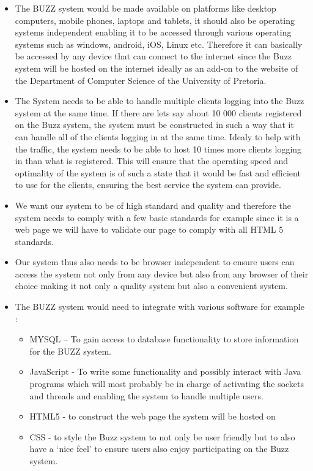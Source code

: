 \documentclass[a4paper]{article}
\begin{document}
\begin{itemize}
\item The BUZZ system would be made available on platforms like desktop computers, mobile phones, laptops and tablets, it should also be operating systems independent enabling it to be accessed through various operating systems such as  windows, android, iOS, Linux etc. Therefore it can basically be accessed by any device that can connect to the internet since the Buzz system will be hosted on the internet ideally as an add-on to the website of the Department of Computer Science of the University of Pretoria. 
\item The System needs to be able to handle multiple clients logging into the Buzz system at the same time. If there are lets say about 10 000 clients registered on the Buzz system, the system must be constructed in such a way that it can handle all of the clients logging in at the same time. Idealy to help with the traffic, the system needs to be able to host 10 times more clients logging in than what is registered. This will ensure that the operating speed and optimality of the system is of such a state that it would be fast and efficient to use for the clients, ensuring the best service the system can provide.
\item We want our system to be of high standard and quality and therefore the system needs to comply with a few basic standards for example  since it is a web page we will have to validate our page to comply with all HTML 5 standards. 
\item Our system thus also needs to be browser independent to ensure users can access the system not only from any device but also from any browser of their choice making it not only a quality system but also a convenient system.
\item The BUZZ system would need to integrate with various software for example :
\begin{itemize}
\item  MYSQL – To gain access to database functionality to store information for the BUZZ system.
\item JavaScript - To write some functionality and possibly interact with Java programs which will most probably be in charge of activating the sockets and threads and enabling the system to handle multiple users.
\item HTML5 - to construct the web page the system will be hosted on 
\item CSS - to style the Buzz system to not only be user friendly but to also have a ‘nice feel’ to ensure users also enjoy participating on the Buzz system.
\end{itemize}
\end{itemize}
\end{document}
